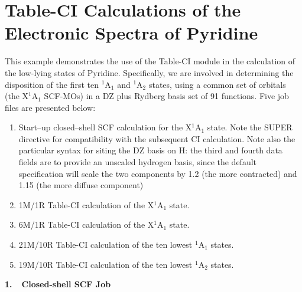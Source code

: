 \documentclass[11pt,fleqn]{article}
\begin{document}
\section[Table-CI Calculations of the Electronic Spectra of Pyridine]{Table-CI Calculations of the Electronic Spectra of Pyridine}
This example demonstrates the use of the Table-CI module
in the calculation of the low-lying states of Pyridine.
Specifically, we are involved in determining the disposition
of the first ten $^{1}$A$_{1}$ and $^{1}$A$_{2}$ states, using
a common set of orbitals (the X$^{1}$A$_{1}$ SCF-MOs) in a 
DZ plus Rydberg basis set of 91 functions.
Five job files are presented below:
\begin{enumerate}
\item Start--up closed--shell SCF calculation for
the X$^{1}$A$_{1}$ state. Note the SUPER directive
for compatibility with the subsequent CI calculation.
Note also the particular syntax for siting the DZ basis on H: the
third and fourth data fields are to provide an unscaled
hydrogen basis, since the default specification will scale the
two components by 1.2 (the more contracted) and 1.15 (the more
diffuse component)
\item 1M/1R Table-CI calculation of the X$^{1}$A$_{1}$ state.
\item 6M/1R Table-CI calculation of the X$^{1}$A$_{1}$ state.
\item 21M/10R Table-CI calculation of the ten lowest $^{1}$A$_{1}$ states.
\item 19M/10R Table-CI calculation of the ten lowest $^{1}$A$_{2}$ states.
\end{enumerate}
{\bf 1.~~Closed-shell SCF Job}\\
\end{document}
